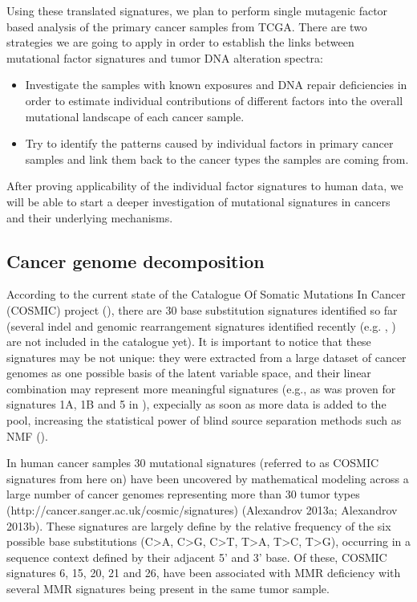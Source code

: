 Using these translated signatures, we plan to perform single mutagenic factor based 
analysis of the primary cancer samples from TCGA. There are two strategies we are 
going to apply in order to establish the links between mutational factor signatures 
and tumor DNA alteration spectra:

\begin{itemize}
\item Investigate the samples with known exposures and DNA repair deficiencies in 
order to estimate individual contributions of different factors into the overall 
mutational landscape of each cancer sample. 
\item Try to identify the patterns caused by individual factors in primary cancer 
samples and link them back to the cancer types the samples are coming from.
\end{itemize}

After proving applicability of the individual factor signatures to human data,
we will be able to start a deeper investigation of mutational signatures in 
cancers and their underlying mechanisms.


\subsection*{Cancer genome decomposition}

According to the current state of the Catalogue Of Somatic Mutations In Cancer (COSMIC) project
(\cite{Forbes2015-gf}), there are 30 base substitution signatures identified so far (several indel 
and genomic rearrangement signatures identified recently (e.g. \cite{Alexandrov2015-clock}, \cite{Nik-Zainal2012-eg}) are 
not included in the catalogue yet). It is important to notice that these signatures may be 
not unique: they were extracted from a large dataset of cancer genomes as one possible basis 
of the latent variable space, and their linear combination may represent more meaningful 
signatures (e.g., as was proven for signatures 1A, 1B and 5 in \cite{Alexandrov2015-clock}), expecially as 
soon as more data is added to the pool, increasing the statistical power of blind source 
separation methods such as NMF (\cite{Alexandrov2013-zu}).

In human cancer samples 30 mutational signatures (referred to as COSMIC signatures 
from here on) have been uncovered by mathematical modeling across a large number of cancer genomes representing more
than 30 tumor types (http://cancer.sanger.ac.uk/cosmic/signatures) (Alexandrov 2013a; 
Alexandrov 2013b). These signatures are largely define by the relative frequency of the six possible 
base substitutions (C>A, C>G, C>T, T>A, T>C, T>G), occurring in a sequence context defined by their
adjacent 5’ and 3’ base. Of these, COSMIC signatures 6, 15, 20, 21 and 26, have been associated 
with MMR deficiency with several MMR signatures being present in the same tumor sample.

